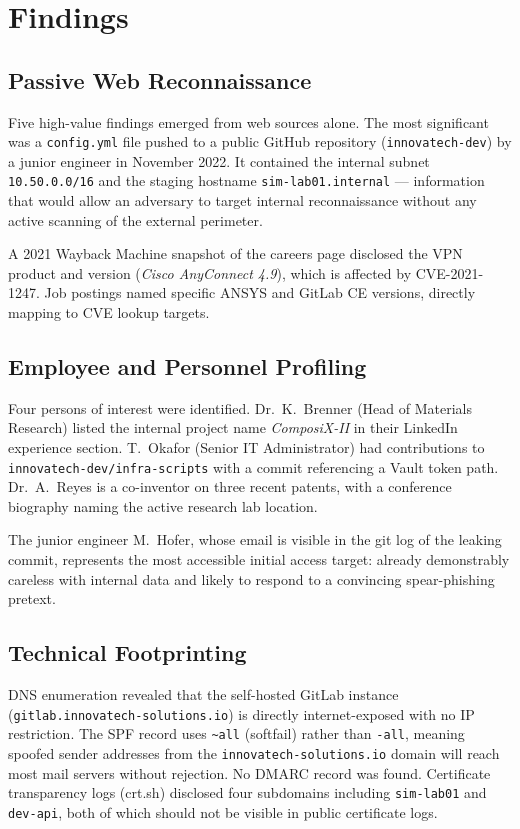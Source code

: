 \documentclass[11pt,a4paper]{article}
\begin{document}
\section{Findings}

\subsection{Passive Web Reconnaissance}

Five high-value findings emerged from web sources alone.  The most significant was a
\texttt{config.yml} file pushed to a public GitHub repository (\texttt{innovatech-dev})
by a junior engineer in November 2022.  It contained the internal subnet
\texttt{10.50.0.0/16} and the staging hostname \texttt{sim-lab01.internal} --- information
that would allow an adversary to target internal reconnaissance without any active
scanning of the external perimeter.

A 2021 Wayback Machine snapshot of the careers page disclosed the VPN product and version
(\textit{Cisco AnyConnect 4.9}), which is affected by CVE-2021-1247.  Job postings named
specific ANSYS and GitLab CE versions, directly mapping to CVE lookup targets.

\subsection{Employee and Personnel Profiling}

Four persons of interest were identified.  Dr.~K.~Brenner (Head of Materials Research)
listed the internal project name \textit{ComposiX-II} in their LinkedIn experience section.
T.~Okafor (Senior IT Administrator) had contributions to \texttt{innovatech-dev/infra-scripts}
with a commit referencing a Vault token path.  Dr.~A.~Reyes is a co-inventor on three
recent patents, with a conference biography naming the active research lab location.

The junior engineer M.~Hofer, whose email is visible in the git log of the leaking commit,
represents the most accessible initial access target: already demonstrably careless with
internal data and likely to respond to a convincing spear-phishing pretext.

\subsection{Technical Footprinting}

DNS enumeration revealed that the self-hosted GitLab instance
(\texttt{gitlab.innovatech-solutions.io}) is directly internet-exposed with no IP
restriction.  The SPF record uses \texttt{\textasciitilde{}all} (softfail) rather than
\texttt{-all}, meaning spoofed sender addresses from the \texttt{innovatech-solutions.io}
domain will reach most mail servers without rejection.  No DMARC record was found.
Certificate transparency logs (crt.sh) disclosed four subdomains including
\texttt{sim-lab01} and \texttt{dev-api}, both of which should not be visible in public
certificate logs.
\end{document}
